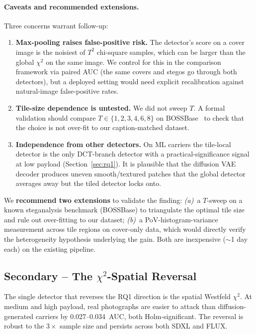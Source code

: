 \documentclass[10pt,twocolumn,a4paper]{article}
\begin{document}
\paragraph{Caveats and recommended extensions.} Three concerns warrant follow-up:
\begin{enumerate}
\item \textbf{Max-pooling raises false-positive risk.} The detector's score on a cover image is the noisiest of $T^2$ chi-square samples, which can be larger than the global $\chi^2$ on the same image. We control for this in the comparison framework via paired AUC (the same covers and stegos go through both detectors), but a deployed setting would need explicit recalibration against natural-image false-positive rates.
\item \textbf{Tile-size dependence is untested.} We did not sweep $T$. A formal validation should compare $T\!\in\!\{1,2,3,4,6,8\}$ on BOSSBase~\cite{bas2011boss} to check that the choice is not over-fit to our caption-matched dataset.
\item \textbf{Independence from other detectors.} On ML carriers the tile-local detector is the only DCT-branch detector with a practical-significance signal at low payload (Section~\ref{sec:rq1}). It is plausible that the diffusion VAE decoder produces uneven smooth/textured patches that the global detector averages away but the tiled detector locks onto.
\end{enumerate}

We \textbf{recommend two extensions} to validate the finding:
\textit{(a)}~a $T$-sweep on a known steganalysis benchmark (BOSSBase) to triangulate the optimal tile size and rule out over-fitting to our dataset;
\textit{(b)}~a PoV-histogram-variance measurement across tile regions on cover-only data, which would directly verify the heterogeneity hypothesis underlying the gain. Both are inexpensive ($\sim$1 day each) on the existing pipeline.

\subsection{Secondary -- The $\chi^2$-Spatial Reversal}
\label{sec:chi2spatial}

The single detector that reverses the RQ1 direction is the spatial Westfeld $\chi^2$. At medium and high payload, real photographs are easier to attack than diffusion-generated carriers by 0.027--0.034~AUC, both Holm-significant. The reversal is robust to the $3\!\times\!$ sample size and persists across both SDXL and FLUX.
\end{document}

